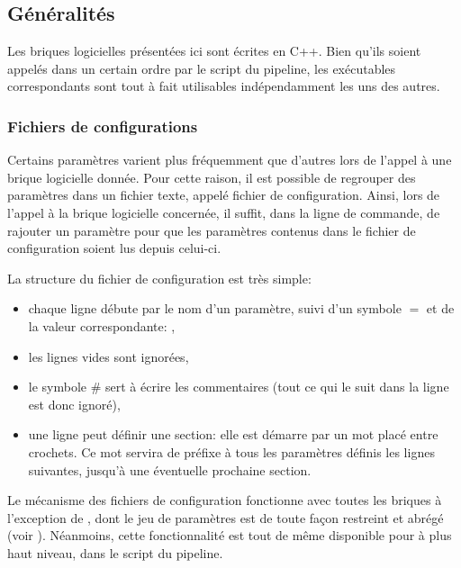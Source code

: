 	\subsection{Généralités}

Les briques logicielles présentées ici sont écrites en C++. Bien qu'ils soient appelés dans un certain ordre par le script du pipeline, les exécutables correspondants sont tout à fait utilisables indépendamment les uns des autres.

	\subsubsection{Fichiers de configurations}
	\label{configfile}

Certains paramètres varient plus fréquemment que d'autres lors de l'appel à une brique logicielle donnée. Pour cette raison, il est possible de regrouper des paramètres dans un fichier texte, appelé fichier de configuration. 
Ainsi, lors de l'appel à la brique logicielle concernée, il suffit, dans la ligne de commande, de rajouter un paramètre  pour que les paramètres contenus dans le fichier de configuration soient lus depuis celui-ci.

La structure du fichier de configuration est très simple:

\begin{itemize}
 \item chaque ligne débute par le nom d'un paramètre, suivi d'un symbole $=$ et de la valeur correspondante: ,
 \item les lignes vides sont ignorées,
 \item le symbole \# sert à écrire les commentaires (tout ce qui le suit dans la ligne est donc ignoré),
 \item une ligne peut définir une section: elle est démarre par un mot placé entre crochets. Ce mot servira de préfixe à tous les paramètres définis les lignes suivantes, jusqu'à une éventuelle prochaine section.
\end{itemize}

Le mécanisme des fichiers de configuration fonctionne avec toutes les briques à l'exception de \rorpo, dont le jeu de paramètres est de toute façon restreint et abrégé (voir ). Néanmoins, cette fonctionnalité est tout de même disponible pour \rorpo à plus haut niveau, dans le script du pipeline.